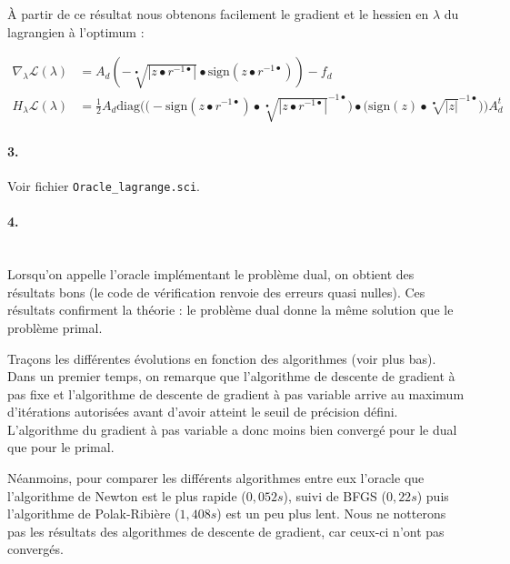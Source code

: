 \documentclass[11pt]{article}
\begin{document}
À partir de ce résultat nous obtenons facilement le gradient et le hessien en $\lambda$ du lagrangien à l'optimum :

\begin{align*}
   \nabla_{\lambda} \mathcal{L}(\lambda) &= \boxed{ A_d (- \sqrt[\bullet]{|z \bullet r^{-1 \bullet}|} \bullet \text{sign}(z \bullet r^{-1 \bullet})) - f_d } \\
   H_{\lambda} \mathcal{L}(\lambda) &= \boxed{ \frac{1}{2} A_d \text{diag}\Bigg(\bigg(- \text{sign}(z \bullet r^{-1 \bullet}) \bullet \sqrt[\bullet]{|z \bullet r^{-1 \bullet}|}^{-1 \bullet}\bigg) \bullet \bigg( \text{sign}(z) \bullet \sqrt[\bullet]{|z|}^{-1 \bullet}\bigg)\Bigg) A_d^t }
\end{align*}

\paragraph{3.} Voir fichier \texttt{Oracle\_lagrange.sci}.

\paragraph{4.} ~\\

Lorsqu'on appelle l'oracle implémentant le problème dual, on obtient des résultats bons (le code de vérification renvoie des erreurs quasi nulles). Ces résultats confirment la théorie : le problème dual donne la même solution que le problème primal.

Traçons les différentes évolutions en fonction des algorithmes (voir plus bas).
Dans un premier temps, on remarque que l'algorithme de descente de gradient à pas fixe et l'algorithme de descente de gradient à pas variable arrive au maximum d'itérations autorisées avant d'avoir atteint le seuil de précision défini. L'algorithme du gradient à pas variable a donc moins bien convergé pour le dual que pour le primal.

Néanmoins, pour comparer les différents algorithmes entre eux l'oracle que l'algorithme de Newton est le plus rapide ($0,052s$), suivi de BFGS ($0,22s$) puis l'algorithme de Polak-Ribière ($1,408s$) est un peu plus lent. Nous ne notterons pas les résultats des algorithmes de descente de gradient, car ceux-ci n'ont pas convergés.
\end{document}
